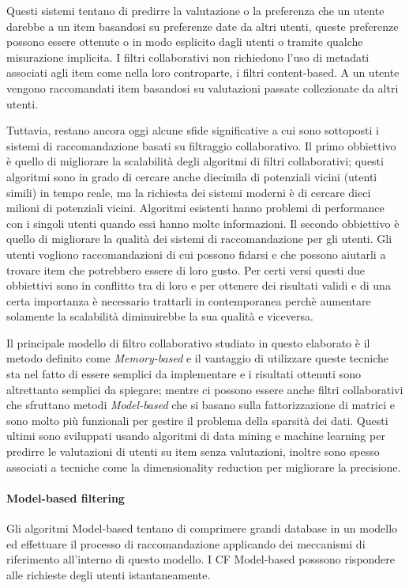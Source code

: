 Questi sistemi tentano di predirre la valutazione o la preferenza che un utente darebbe a un item basandosi su preferenze date da altri 
utenti, queste preferenze possono essere ottenute o in modo esplicito dagli utenti o tramite qualche misurazione implicita. 
I filtri collaborativi non richiedono l'uso di metadati associati agli item come nella loro controparte, i filtri content-based. A un 
utente vengono raccomandati item basandosi su valutazioni passate collezionate da altri utenti.

Tuttavia, restano ancora oggi alcune sfide significative a cui sono sottoposti i sistemi di raccomandazione basati su 
filtraggio collaborativo.
Il primo obbiettivo è quello di migliorare la scalabilità degli algoritmi di filtri collaborativi; questi algoritmi sono in grado di cercare
anche diecimila di potenziali vicini (utenti simili) in tempo reale, ma la richiesta dei sistemi moderni è di cercare dieci milioni di 
potenziali vicini. Algoritmi esistenti hanno problemi di performance con i singoli utenti quando essi hanno molte informazioni.
Il secondo obbiettivo è quello di migliorare la qualità dei sistemi di raccomandazione per gli utenti. Gli utenti vogliono
raccomandazioni di cui possono fidarsi e che possono aiutarli a trovare item che potrebbero essere di loro gusto.
Per certi versi questi due obbiettivi sono in conflitto tra di loro e per ottenere dei risultati validi e di una certa importanza è 
necessario trattarli in contemporanea perchè aumentare solamente la scalabilità diminuirebbe la sua qualità e viceversa. 
\cite{item-based-collaborative-filtering} 

Il principale modello di filtro collaborativo studiato in questo elaborato è il metodo definito come \textit{Memory-based} e il 
vantaggio di utilizzare queste tecniche sta nel fatto di essere semplici da implementare e i risultati ottenuti sono altrettanto 
semplici da spiegare; mentre ci possono essere anche filtri collaborativi che sfruttano metodi \textit{Model-based} che si basano sulla 
fattorizzazione di matrici e sono molto più funzionali per gestire il problema della sparsità dei dati. Questi ultimi sono sviluppati
usando algoritmi di data mining e machine learning per predirre le valutazioni di utenti su item senza valutazioni, inoltre sono spesso 
associati a tecniche come la dimensionality reduction per migliorare la precisione.


\paragraph{Model-based filtering} 
Gli algoritmi Model-based tentano di comprimere grandi database in un modello ed effettuare il processo di raccomandazione applicando dei
meccanismi di riferimento all'interno di questo modello. 
I CF Model-based posssono rispondere alle richieste degli utenti istantaneamente. \cite{model-based-approach-for-collaborative-filtering}


